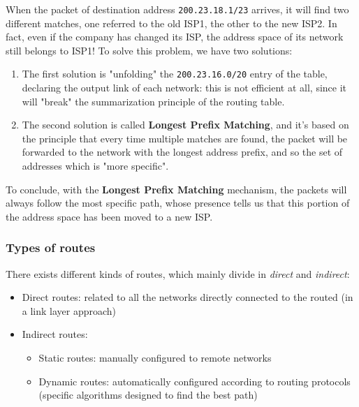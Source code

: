 \noindent When the packet of destination address \texttt{200.23.18.1/23} arrives, it will find two different matches, one referred to the old ISP1, the other to the new ISP2. In fact, even if the company has changed its ISP, the address space of its network still belongs to ISP1! To solve this problem, we have two solutions:
\begin{enumerate}
    \item The first solution is "unfolding" the \texttt{200.23.16.0/20} entry of the table, declaring the output link of each network: this is not efficient at all, since it will "break" the summarization principle of the routing table.
    \item The second solution is called \textbf{Longest Prefix Matching}, and it's based on the principle that every time multiple matches are found, the packet will be forwarded to the network with the longest address prefix, and so the set of addresses which is "more specific".
\end{enumerate}

\noindent To conclude, with the \textbf{Longest Prefix Matching} mechanism, the packets will always follow the most specific path, whose presence tells us that this portion of the address space has been moved to a new ISP. 

\subsubsection{Types of routes}
There exists different kinds of routes, which mainly divide in \textit{direct} and \textit{indirect}:
\begin{itemize}
    \item Direct routes: related to all the networks directly connected to the routed (in a link layer approach)
    \item Indirect routes:
    \begin{itemize}
        \item Static routes: manually configured to remote networks
        \item Dynamic routes: automatically configured according to routing protocols (specific algorithms designed to find the best path)
    \end{itemize}
\end{itemize}

